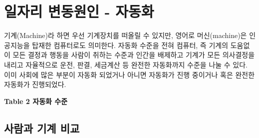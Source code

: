 \documentclass[smallextended]{svjour3}       %
\begin{document}
\hypertarget{automation-overview}{%
\section{일자리 변동원인 - 자동화}\label{automation-overview}}

기계(Machine)라 하면 우선 기계장치를 떠올릴 수 있지만, 영어로
머신(machine)은 인공지능을 탑재한 컴퓨터로도 의미한다. 자동화 수준을
전혀 컴퓨터, 즉 기계의 도움없이 모든 결정과 행동을 사람이 취하는 수준과
인간을 배제하고 기계가 모든 의사결정을 내리고 자율적으로 운전, 판결,
세금계산 등 완전한 자동화\cite{cummings2014man}까지 수준을 나눌 수 있다.
이미 사회에 많은 부분이 자동화 되었거나 아니면 자동화가 진행 중이거나
혹은 완전한 자동화가 진행되었다.

\begin{table}[H]
\centering
{}
\end{table}

\textbf{Table 2 자동화 수준}

\hypertarget{man-human-comparison}{%
\subsection{사람과 기계 비교}\label{man-human-comparison}}
\end{document}
